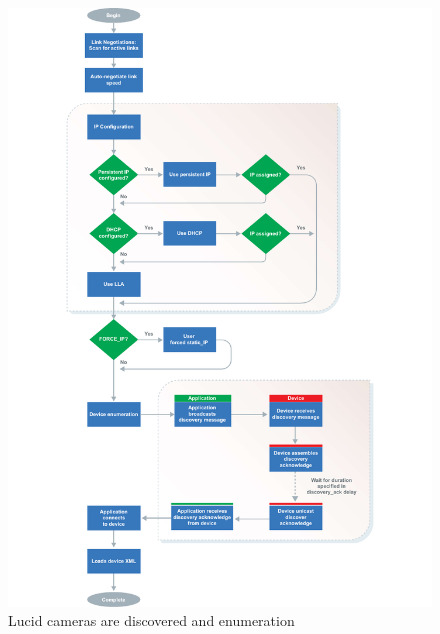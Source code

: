 \begin{figure}
    \centering
    \includegraphics[width=\textwidth]{figures/thing.pdf}
    \caption{Lucid cameras are discovered and enumeration \cite{TritonMPPolarized2020}}
    \label{fig:lucid_discovery}
\end{figure}